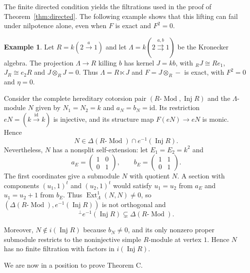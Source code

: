 \documentclass[11pt]{amsart}
\theoremstyle{definition}
\newtheorem{example}[theorem]{Example}
\theoremstyle{remark}
\theoremstyle{plain}
\numberwithin{equation}{section}
\begin{document}
The finite directed condition yields the filtrations used in the proof of
Theorem~\ref{thm:directed}. The following example shows that this lifting can fail under
nilpotence alone, even when $F$ is exact and $F^2 = 0$.

\begin{example}\label{ex:nilpotent-obstruction}
Let $R = k(2\xrightarrow a1)$ and let
$\Lambda = k(2\overset{a, b}{\rightrightarrows}1)$ be the Kronecker algebra.
The projection $\Lambda \to R$ killing $b$ has kernel $J = kb$, with
${}_RJ \cong Re_1$, $J_R \cong e_2R$ and $J \otimes_RJ = 0$. Thus
$\Lambda = R \ltimes J$ and $F = J \otimes_R-$ is exact, with $F^2 = 0$ and
$\eta = 0$.

Consider the complete hereditary cotorsion pair
$(R\text{-}\operatorname{Mod}, \operatorname{Inj} R)$ and the $\Lambda$-module $N$ given by
$N_1 = N_2 = k$ and $a_N = b_N = \mathrm{id}$. Its restriction $eN = (k\xrightarrow{\mathrm{id}}k)$
is injective, and its structure map $F(eN) \to eN$ is monic. Hence
\[
 N \in \Delta(R\text{-}\operatorname{Mod}) \cap e^{-1}(\operatorname{Inj} R).
\]
Nevertheless, $N$ has a nonsplit self-extension: let $E_1 = E_2 = k^2$ and
\[
 a_E = \begin{pmatrix}1 & 0\\0 & 1\end{pmatrix}, \qquad
 b_E = \begin{pmatrix}1 & 1\\0 & 1\end{pmatrix}.
\]
The first coordinates give a submodule $N$ with quotient $N$. A section
with components $(u_1, 1)^t$ and $(u_2, 1)^t$ would satisfy $u_1 = u_2$
from $a_E$ and $u_1 = u_2+1$ from $b_E$. Thus
$\operatorname{Ext}^1_\Lambda(N, N) \neq 0$, so
$(\Delta(R\text{-}\operatorname{Mod}), e^{-1}(\operatorname{Inj} R))$ is not orthogonal and
\[
 {}^\perp e^{-1}(\operatorname{Inj} R) \subsetneq \Delta(R\text{-}\operatorname{Mod}).
\]

Moreover, $N \notin i(\operatorname{Inj} R)$ because $b_N \neq 0$, and its only nonzero
proper submodule restricts to the noninjective simple $R$-module at
vertex $1$. Hence $N$ has no finite filtration with factors in $i(\operatorname{Inj} R)$.
\end{example}

We are now in a position to prove Theorem C.
\end{document}
